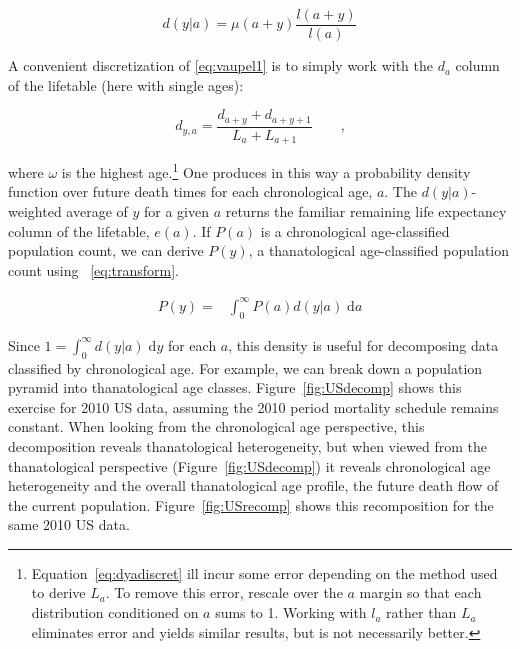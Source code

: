 \documentclass{article}
\newcommand{\dd}{\; \mathrm{d}}
\begin{document}
\begin{equation}
\label{eq:vaupel1}
d(y | a) = \mu(a+y)\frac{l(a+y)}{l(a)}
\end{equation}

A convenient discretization of \eqref{eq:vaupel1} is to simply work with the
$d_a$ column of the lifetable (here with single ages):

\begin{equation}
\label{eq:dyadiscret}
d_{y, a} =  \frac{d_{a+y}+d_{a+y+1}}{L_a + L_{a+1}} \quad\quad \text{,}
\end{equation}

\noindent where $\omega$ is the highest
age.\footnote{Equation~\eqref{eq:dyadiscret} ill incur some error depending on
the method used to derive $L_a$. To remove this error, rescale over the $a$ margin so that each distribution conditioned on $a$
sums to 1. Working with $l_a$ rather than $L_a$ eliminates error and yields
similar results, but is not necessarily better.} One produces in this way a
probability density function over future death times for each chronological age,
$a$. The $d(y|a)$- weighted average of $y$ for a given $a$ returns the familiar
remaining life expectancy column of the lifetable, $e(a)$. If $P(a)$ is a
chronological age-classified population count, we can derive $P(y)$, a
thanatological age-classified population count using ~\eqref{eq:transform}.

\begin{align}
\label{eq:transform}
P(y) =& \int_0^\infty P(a) d(y | a) \dd a
\end{align}

Since $1 = \int_0^\infty d(y|a) \dd y$ for each $a$,
this density is useful for decomposing data classified by chronological age. For
example, we can break down a population pyramid into thanatological age classes.
Figure~\ref{fig:USdecomp} shows this exercise for 2010 US data, assuming the
2010 period mortality schedule remains constant. When looking from the
chronological age perspective, this decomposition reveals thanatological
heterogeneity, but when viewed from the thanatological perspective
(Figure~\ref{fig:USdecomp}) it reveals chronological age heterogeneity and the
overall thanatological age profile, the future death flow of the current
population.
Figure~\ref{fig:USrecomp} shows this recomposition for the same 2010
US data.
\end{document}
